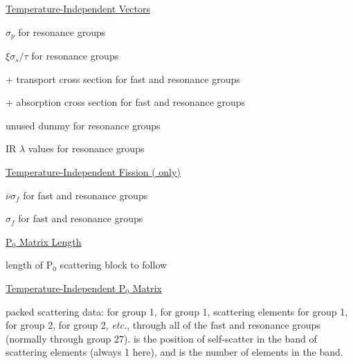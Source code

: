 \noindent
\underline{Temperature-Independent Vectors }

\begin{list}{}{\setlength{\leftmargin}{2in}\setlength{\labelwidth}{1.7in}}
\item[\cword{(SIGP(I),I=1,N2)}\hfill] $\sigma_p$ for resonance groups
\item[\cword{(XX(I),I=1,N2)}\hfill] $\xi\sigma_s/\tau$ for resonance groups
\item[\cword{(XTR(I),I=1,N1}+\cword{N2)}\hfill] transport cross section for
  fast and resonance groups
\item[\cword{(ABS(I),I=N1}+\cword{N2)}\hfill] absorption cross section for fast
    and resonance groups
\item[\cword{(DUM,I=1,N2)}\hfill] unused dummy for resonance groups
\item[\cword{(ALAM(I),I=1,N2)}\hfill] IR $\lambda$ values for resonance groups
\end{list}

\noindent
\underline{Temperature-Independent Fission ( only)
   }

\begin{list}{}{\setlength{\leftmargin}{2in}\setlength{\labelwidth}{1.7in}}
\item[\cword{(NSIGF(I),I=1,N1)}\hfill] $\overline{\nu}\sigma_f$ for fast
    and resonance groups
\item[\cword{(SIGF(I),I=1,N1)}\hfill] $\sigma_f$ for fast and resonance groups
\end{list}

\noindent
\underline{P$_0$ Matrix Length }

\begin{list}{}{\setlength{\leftmargin}{2in}\setlength{\labelwidth}{1.7in}}
\item[\cword{NDAT}\hfill] length of P$_0$ scattering block to follow
\end{list}

\noindent
\underline{Temperature-Independent P$_0$ Matrix }

\begin{list}{}{\setlength{\leftmargin}{2in}\setlength{\labelwidth}{1.7in}}
\item[\cword{(XS(I),I=1,NDAT)}\hfill] packed scattering data:  for
     group 1,  for group 1,  scattering elements
     for group 1,  for group 2,  for group 2, {\it etc.},
     through all of the fast and resonance groups (normally through
     group 27).   is the position of self-scatter in the
     band of scattering elements (always 1 here), and  is
     the number of elements in the band.
\end{list}

